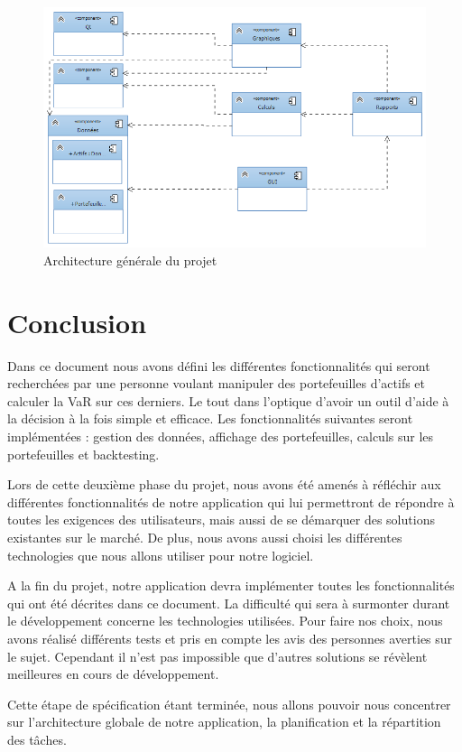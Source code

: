 \documentclass[a4paper]{report}
\begin{document}
\begin{figure}[H]
  \center
  \includegraphics[width=1\textwidth]{ArchiGenerale.png}
  \caption{Architecture générale du projet}
\end{figure} 




\chapter{Conclusion}
Dans ce document nous avons défini les différentes fonctionnalités qui seront recherchées par une personne voulant manipuler des portefeuilles d’actifs et calculer la VaR sur ces derniers.
Le tout dans l'optique d'avoir un outil d'aide à la décision à la fois simple et efficace.
Les fonctionnalités suivantes seront implémentées : gestion des données, affichage des portefeuilles, calculs sur les portefeuilles et backtesting.

Lors de cette deuxième phase du projet, nous avons été amenés à réfléchir aux différentes fonctionnalités de notre application qui lui permettront de répondre à toutes les exigences des utilisateurs, mais aussi de se démarquer des solutions existantes sur le marché.
De plus, nous avons aussi choisi les différentes technologies que nous allons utiliser pour notre logiciel.

A la fin du projet, notre application devra implémenter toutes les fonctionnalités qui ont été décrites dans ce document.
La difficulté qui sera à surmonter durant le développement concerne les technologies utilisées.
Pour faire nos choix, nous avons réalisé différents tests et pris en compte les avis des personnes averties sur le sujet.
Cependant il n’est pas impossible que d’autres solutions se révèlent meilleures en cours de développement.

Cette étape de spécification étant terminée, nous allons pouvoir nous concentrer sur l’architecture globale de notre application, la planification et la répartition des tâches.
\end{document}
